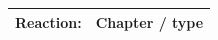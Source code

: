 \begin{table}[h]
\begin{tabular}{ | p{7cm}| m{3.5cm} | } 
\hline
Reaction: & Chapter / type \\ 
\hline

\end{tabular}
\end{table}
